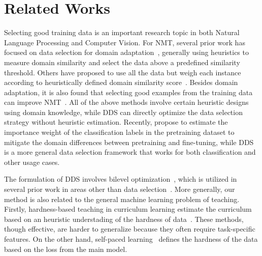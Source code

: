 \section{\label{sec:related_work}Related Works}

Selecting good training data is an important research topic in both Natural Language Processing and Computer Vision. For NMT, several prior work has focused on data selection for domain adaptation~\citep{moore2010intelligent,axelrod2011domain}, generally using heuristics to measure domain similarity and select the data above a predefined similarity threshold. Others have proposed to use all the data but weigh each instance according to heuristically defined domain similarity score~\citep{jiang-zhai-2007-instance,foster-etal-2010-discriminative,wang-etal-2017-instance}. Besides domain adaptation, it is also found that selecting good examples from the training data can improve NMT~\citep{vyas-etal-2018-identifying,pham-etal-2018-fixing}. All of the above methods involve certain heuristic designs using domain knowledge, while DDS can directly optimize the data selection strategy without heuristic estimation. Recently, \cite{domain_adapt_transfer} propose to estimate the importance weight of the classification labels in the pretraining dataset to mitigate the domain differences between pretraining and fine-tuning, while DDS is a more general data selection framework that works for both classification and other usage cases.  

The formulation of DDS involves bilevel optimization~\citep{bilevel_optim,hier_optim}, which is utilized in several prior work in areas other than data selection~\citep{darts,hyper_grad,finn2017model}. More generally, our method is also related to the general machine learning problem of teaching. Firstly, hardness-based teaching in curriculum learning estimate the curriculum based on an heuristic understading of the hardness of data~\citep{cl_bengio,automate_cl_GravesBMMK17,SpitkovskyAJ10,zhang2016boosting,zhang2018empirical,platanios19naacl,baysian_curriculum}. These methods, though effective, are harder to generalize because they often require task-specific features. On the other hand, self-paced learning~\citep{spl_visual_category,spl_kumar,spl_visual_category} defines the hardness of the data based on the loss from the main model.

